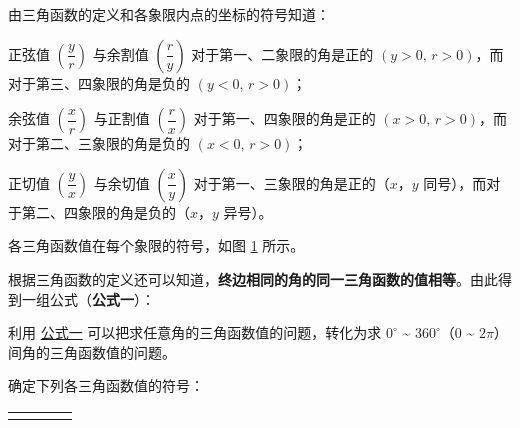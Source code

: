 \vspace{0.5em}
由三角函数的定义和各象限内点的坐标的符号知道：

\vspace{0.5em}
正弦值 $\left( \dfrac y r \right)$ \vspace{0.5em} 与余割值 $\left( \dfrac r y \right)$ 对于第一、二象限的角是正的 $(y > 0, \, r > 0)$，而对于第三、四象限的角是负的 $(y < 0, \, r > 0)$；

\vspace{0.5em}
余弦值 $\left( \dfrac x r \right)$ \vspace{0.5em} 与正割值 $\left( \dfrac r x \right)$ 对于第一、四象限的角是正的 $(x > 0, \, r > 0)$，而对于第二、三象限的角是负的 $(x < 0, \, r > 0)$；

\vspace{0.5em}
正切值 $\left( \dfrac y x \right)$ \vspace{0.5em} 与余切值 $\left( \dfrac x y \right)$ 对于第一、三象限的角是正的（$x$，$y$ 同号），而对于第二、四象限的角是负的（$x$，$y$ 异号）。

各三角函数值在每个象限的符号，如图 \ref{fig:2-14} 所示。

\begin{figure}[htbp]
    \centering
    
    \caption{}\label{fig:2-14}
\end{figure}

根据三角函数的定义还可以知道，\textbf{终边相同的角的同一三角函数的值相等}。由此得到一组公式（\textbf{公式一}）：

\begin{center}
\end{center}

利用 \hyperref[gongshi:1]{公式一} 可以把求任意角的三角函数值的问题，转化为求 $0^\circ$ \~{} $360^\circ$（$0$ \~{} $2\pi$）间角的三角函数值的问题。

\liti 确定下列各三角函数值的符号：
\begin{xiaoxiaotis}

    \begin{tabular}[t]{*{4}{@{}p{9em}}}
         & 
            &  & 
    \end{tabular}
    \vspace{0.5em}
    
\end{xiaoxiaotis}

